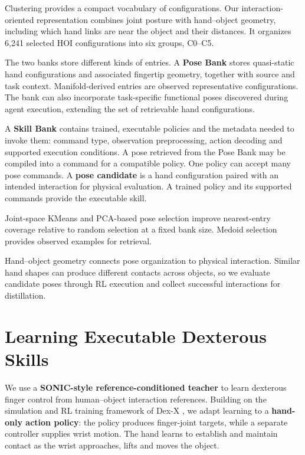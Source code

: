 \documentclass[10pt,twocolumn]{article}
\begin{document}
Clustering provides a compact vocabulary of configurations. Our interaction-oriented representation combines joint posture with hand--object geometry, including which hand links are near the object and their distances. It organizes 6,241 selected HOI configurations into six groups, C0--C5.

The two banks store different kinds of entries. A \textbf{Pose Bank} stores quasi-static hand configurations and associated fingertip geometry, together with source and task context. Manifold-derived entries are observed representative configurations. The bank can also incorporate task-specific functional poses discovered during agent execution, extending the set of retrievable hand configurations.

A \textbf{Skill Bank} contains trained, executable policies and the metadata needed to invoke them: command type, observation preprocessing, action decoding and supported execution conditions. A pose retrieved from the Pose Bank may be compiled into a command for a compatible policy. One policy can accept many pose commands. A \textbf{pose candidate} is a hand configuration paired with an intended interaction for physical evaluation. A trained policy and its supported commands provide the executable skill.

Joint-space KMeans and PCA-based pose selection improve nearest-entry coverage relative to random selection at a fixed bank size. Medoid selection provides observed examples for retrieval.

Hand--object geometry connects pose organization to physical interaction. Similar hand shapes can produce different contacts across objects, so we evaluate candidate poses through RL execution and collect successful interactions for distillation.

\section{Learning Executable Dexterous Skills}

We use a \textbf{SONIC-style reference-conditioned teacher} to learn dexterous finger control from human--object interaction references. Building on the simulation and RL training framework of Dex-X \citep{chen2026dexx}, we adapt learning to a \textbf{hand-only action policy}: the policy produces finger-joint targets, while a separate controller supplies wrist motion. The hand learns to establish and maintain contact as the wrist approaches, lifts and moves the object.
\end{document}
